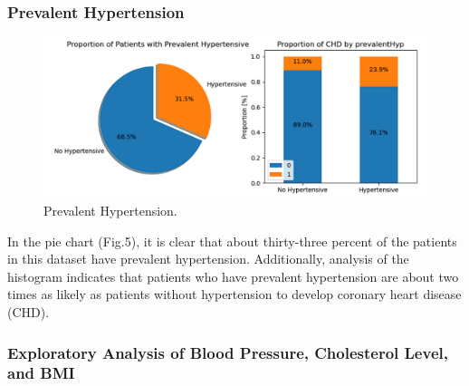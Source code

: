 \documentclass[conference]{IEEEtran}
\begin{document}
\subsubsection{Prevalent Hypertension}

\begin{figure}[H]
    \centerline{\includegraphics[width=0.7\linewidth]{fig5.png}}
    \caption{Prevalent Hypertension.}
    \label{fig5}
\end{figure}

In the pie chart (Fig.5), it is clear that about thirty-three percent of the patients in this dataset have prevalent hypertension. Additionally, analysis of the histogram indicates that patients who have prevalent hypertension are about two times as likely as patients without hypertension to develop coronary heart disease (CHD).

\subsubsection{Exploratory Analysis of Blood Pressure, Cholesterol Level, and BMI}
\end{document}
